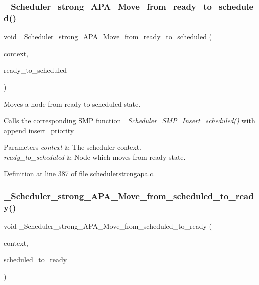 \subsubsection{\texorpdfstring{\+\_\+\+Scheduler\+\_\+strong\+\_\+\+A\+P\+A\+\_\+\+Move\+\_\+from\+\_\+ready\+\_\+to\+\_\+scheduled()}{\_Scheduler\_strong\_APA\_Move\_from\_ready\_to\_scheduled()}}
{\footnotesize\ttfamily void \+\_\+\+Scheduler\+\_\+strong\+\_\+\+A\+P\+A\+\_\+\+Move\+\_\+from\+\_\+ready\+\_\+to\+\_\+scheduled (\begin{DoxyParamCaption}\item[{Scheduler\+\_\+\+Context $\ast$}]{context,  }\item[{Scheduler\+\_\+\+Node $\ast$}]{ready\+\_\+to\+\_\+scheduled }\end{DoxyParamCaption})}



Moves a node from ready to scheduled state. 

Calls the corresponding S\+MP function {\itshape \+\_\+\+Scheduler\+\_\+\+S\+M\+P\+\_\+\+Insert\+\_\+scheduled()} with append insert\+\_\+priority


\begin{DoxyParams}{Parameters}
{\em context} & The scheduler context. \\
\hline
{\em ready\+\_\+to\+\_\+scheduled} & Node which moves from ready state. \\
\hline
\end{DoxyParams}


Definition at line 387 of file schedulerstrongapa.\+c.

\mbox{\label{group__RTEMSScoreSchedulerStrongAPA_ga9589d6542faf83879288d437ca84c907}} 
\subsubsection{\texorpdfstring{\+\_\+\+Scheduler\+\_\+strong\+\_\+\+A\+P\+A\+\_\+\+Move\+\_\+from\+\_\+scheduled\+\_\+to\+\_\+ready()}{\_Scheduler\_strong\_APA\_Move\_from\_scheduled\_to\_ready()}}
{\footnotesize\ttfamily void \+\_\+\+Scheduler\+\_\+strong\+\_\+\+A\+P\+A\+\_\+\+Move\+\_\+from\+\_\+scheduled\+\_\+to\+\_\+ready (\begin{DoxyParamCaption}\item[{Scheduler\+\_\+\+Context $\ast$}]{context,  }\item[{Scheduler\+\_\+\+Node $\ast$}]{scheduled\+\_\+to\+\_\+ready }\end{DoxyParamCaption})}




